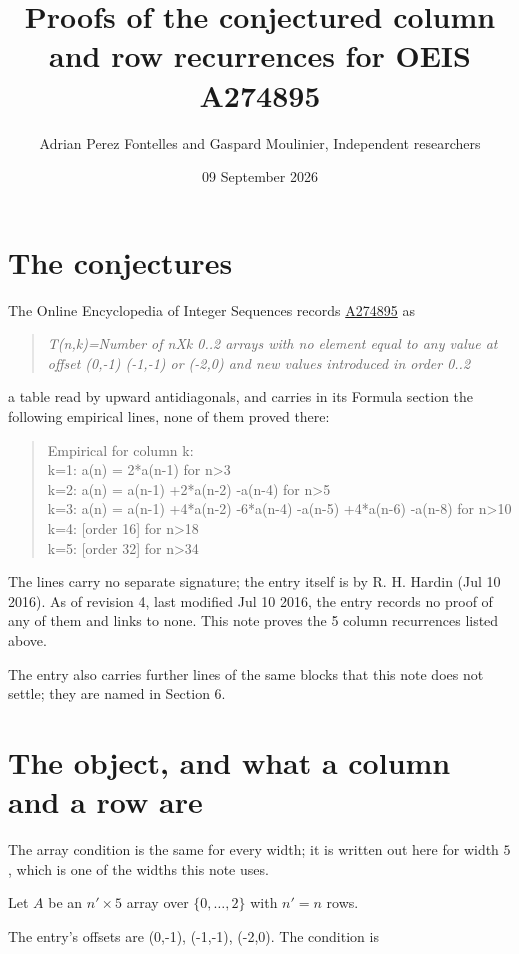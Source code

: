 \documentclass[11pt]{article}
\title{Proofs of the conjectured column and row recurrences for OEIS A274895}
\author{Adrian Perez Fontelles and Gaspard Moulinier, Independent researchers}
\date{09 September 2026}
\theoremstyle{definition}
\begin{document}
\maketitle
\section{The conjectures}

The Online Encyclopedia of Integer Sequences records \href{https://oeis.org/A274895}{A274895} as

\begin{quote}\itshape T(n,k)=Number of nXk 0..2 arrays with no element equal to any value at offset (0,-1) (-1,-1) or (-2,0) and new values introduced in order 0..2\end{quote}

a table read by upward antidiagonals, and carries in its Formula section the following empirical lines, none of them proved there:

\begin{quote}\ttfamily Empirical for column k:\\
k=1: a(n) = 2*a(n-1) for n>3\\k=2: a(n) = a(n-1) +2*a(n-2) -a(n-4) for n>5\\k=3: a(n) = a(n-1) +4*a(n-2) -6*a(n-4) -a(n-5) +4*a(n-6) -a(n-8) for n>10\\k=4: [order 16] for n>18\\k=5: [order 32] for n>34\end{quote}

The lines carry no separate signature; the entry itself is by R. H. Hardin (Jul 10 2016). As of revision 4, last modified Jul 10 2016, the entry records no proof of any of them and links to none. This note proves the 5 column recurrences listed above.

The entry also carries further lines of the same blocks that this note does not settle; they are named in Section 6.

\section{The object, and what a column and a row are}

The array condition is the same for every width; it is written out here for width $5$, which is one of the widths this note uses.

Let $A$ be an $n' \times 5$ array over $\{0,\dots,2\}$ with $n' = n$ rows.

The entry's offsets are (0,-1), (-1,-1), (-2,0). The condition is
\end{document}
